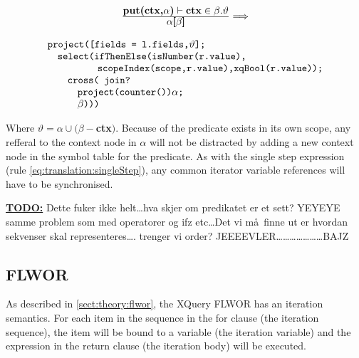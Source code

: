 \begin{equation}
\centering
\begin{array}{c}
	\frac{\displaystyle \textbf{put(ctx,}\alpha\textbf{)}\vdash\textbf{ctx}\in\beta.\vartheta}
	{\displaystyle \alpha\textsf{[}\beta\textsf{]}}

	\Longrightarrow 
	\\
	\mbox{}
	\\
	\begin{array}{l}
		\mbox{\texttt{project([fields = l.fields,}} \vartheta \mbox{\texttt{];}} 
		\\ \quad \mbox{\texttt{select(ifThenElse(isNumber(r.value),}} \\ \quad 
		\qquad\qquad \mbox{\texttt{scopeIndex(scope,r.value),xqBool(r.value));}} \\ \quad\quad
		\mbox{\texttt{cross( join?}} \\ \quad\quad\quad
		\mbox{\texttt{project(counter())}}\alpha \texttt{;} \\ \quad\quad\quad
		\beta \mbox{\texttt{)))}}
	\end{array}
\end{array}
\label{eq:translation:iterationPredicate}
\end{equation}

Where $\vartheta = \alpha \cup (\beta -$\textbf{ctx}$)$. Because of the predicate exists in its own scope, any
refferal to the context node in $\alpha$ will not be distracted by adding a new context node in the symbol table
for the predicate. As with the single step expression (rule \ref{eq:translation:singleStep}), any common iterator
variable references will have to be synchronised.

\textbf{\underline{\Large TODO:}} Dette fuker ikke helt\ldots hva skjer om predikatet er et sett? YEYEYE samme
problem som med operatorer og ifz etc\ldots Det vi m\aa~finne ut er hvordan sekvenser skal representeres\ldots.
trenger vi order? JEEEEVLER\ldots\ldots\ldots\ldots\ldots\ldots\ldots  BAJZ


\subsection{FLWOR}
\label{sect:translation:iteration}
As described in \ref{sect:theory:flwor}, the XQuery FLWOR has an iteration semantics. For each item in the
sequence in the \textsf{for} clause (the iteration sequence), the item will be bound to a variable (the iteration
variable) and the expression in the \textsf{return} clause (the iteration body) will be executed.

